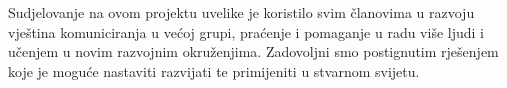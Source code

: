		 Sudjelovanje na ovom projektu uvelike je koristilo svim članovima u razvoju vještina komuniciranja u većoj grupi, praćenje i pomaganje u radu više ljudi i učenjem u novim razvojnim okruženjima. Zadovoljni smo postignutim rješenjem koje je moguće nastaviti razvijati te primijeniti u stvarnom svijetu.
		
		\eject

\begin{comment}
	\textbf{\textit{dio 2. revizije}}\\
	
	\textit{U ovom poglavlju potrebno je napisati osvrt na vrijeme izrade projektnog zadatka, koji su tehnički izazovi prepoznati, jesu li riješeni ili kako bi mogli biti riješeni, koja su znanja stečena pri izradi projekta, koja bi znanja bila posebno potrebna za brže i kvalitetnije ostvarenje projekta i koje bi bile perspektive za nastavak rada u projektnoj grupi.}
	
	\textit{Potrebno je točno popisati funkcionalnosti koje nisu implementirane u ostvarenoj aplikaciji.}
\end{comment}